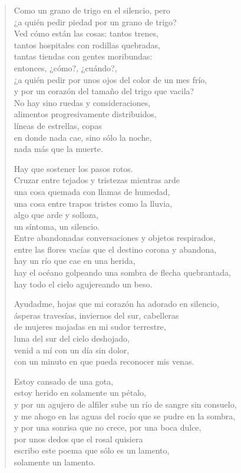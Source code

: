 \documentclass[12pt]{article}
\begin{document}
\begin{verse}
Como un grano de trigo en el silencio, pero\\
¿a quién pedir piedad por un grano de trigo?\\
Ved cómo están las cosas: tantos trenes,\\
tantos hospitales con rodillas quebradas,\\
tantas tiendas con gentes moribundas:\\
entonces, ¿cómo?, ¿cuándo?,\\
¿a quién pedir por unos ojos del color de un mes frío,\\
y por un corazón del tamaño del trigo que vacila?\\
No hay sino ruedas y consideraciones,\\
alimentos progresivamente distribuidos,\\
líneas de estrellas, copas\\
en donde nada cae, sino sólo la noche,\\
nada más que la muerte.  

Hay que sostener los pasos rotos.\\
Cruzar entre tejados y tristezas mientras arde\\
una cosa quemada con llamas de humedad,\\
una cosa entre trapos tristes como la lluvia,\\
algo que arde y solloza,\\
un síntoma, un silencio.\\
Entre abandonadas conversaciones y objetos respirados,\\
entre las flores vacías que el destino corona y abandona,\\
hay un río que cae en una herida,\\
hay el océano golpeando una sombra de flecha quebrantada,\\
hay todo el cielo agujereando un beso.  

Ayudadme, hojas que mi corazón ha adorado en silencio,\\
ásperas travesías, inviernos del sur, cabelleras\\
de mujeres mojadas en mi sudor terrestre,\\
luna del sur del cielo deshojado,\\
venid a mí con un día sin dolor,\\
con un minuto en que pueda reconocer mis venas.  

Estoy cansado de una gota,\\
estoy herido en solamente un pétalo,\\
y por un agujero de alfiler sube un río de sangre sin consuelo,\\
y me ahogo en las aguas del rocío que se pudre en la sombra,\\
y por una sonrisa que no crece, por una boca dulce,\\
por unos dedos que el rosal quisiera\\
escribo este poema que sólo es un lamento,\\
solamente un lamento.  

\end{verse}
\end{document}
